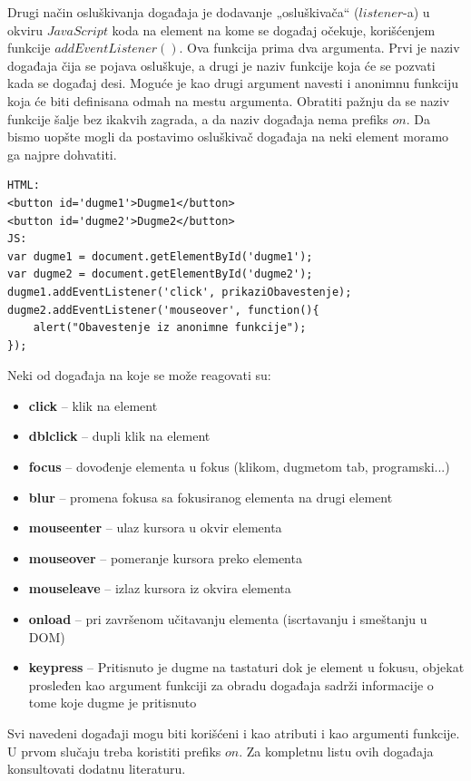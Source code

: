 \documentclass[a4paper]{article}
\begin{document}
Drugi način osluškivanja događaja je dodavanje „osluškivača“ ($listener$-a) u okviru
$JavaScript$ koda na element na kome se događaj očekuje, korišćenjem funkcije
$addEventListener()$. Ova funkcija prima dva argumenta. Prvi je naziv događaja čija se
pojava osluškuje, a drugi je naziv funkcije koja će se pozvati kada se događaj desi. Moguće je kao drugi argument navesti i anonimnu funkciju koja će biti definisana odmah na mestu argumenta. Obratiti pažnju da se naziv funkcije šalje bez ikakvih zagrada, a da naziv događaja nema prefiks $on$. Da bismo uopšte mogli da postavimo osluškivač događaja na neki element moramo ga najpre dohvatiti.
\begin{lstlisting}[backgroundcolor = \color{lightgray}]
HTML:
<button id='dugme1'>Dugme1</button>
<button id='dugme2'>Dugme2</button>
JS:
var dugme1 = document.getElementById('dugme1');
var dugme2 = document.getElementById('dugme2');
dugme1.addEventListener('click', prikaziObavestenje);
dugme2.addEventListener('mouseover', function(){
	alert("Obavestenje iz anonimne funkcije");
});
\end{lstlisting}

Neki od događaja na koje se može reagovati su:
\begin{itemize}
\item \textbf{click} – klik na element
\item \textbf{dblclick} – dupli klik na element
\item \textbf{focus}  – dovođenje elementa u fokus (klikom, dugmetom tab, programski...)
\item \textbf{blur} – promena fokusa sa fokusiranog elementa na drugi element
\item \textbf{mouseenter}  – ulaz kursora u okvir elementa
\item \textbf{mouseover} – pomeranje kursora preko elementa
\item \textbf{mouseleave} – izlaz kursora iz okvira elementa
\item \textbf{onload} – pri završenom učitavanju elementa (iscrtavanju i smeštanju u DOM)
\item \textbf{keypress}  – Pritisnuto je dugme na tastaturi dok je element u fokusu, objekat prosleđen kao argument funkciji za obradu događaja sadrži informacije o tome koje dugme je
pritisnuto
\end{itemize}

Svi navedeni događaji mogu biti korišćeni i kao atributi i kao argumenti funkcije. U prvom slučaju treba koristiti prefiks $on$. Za kompletnu listu ovih događaja konsultovati dodatnu literaturu.
\end{document}
